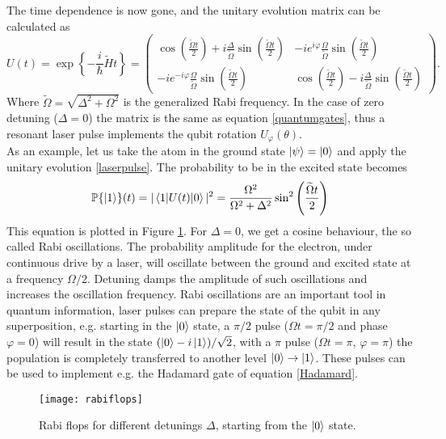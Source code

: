 The time dependence is now gone, and the unitary evolution matrix can be calculated as
\begin{equation}
\label{laserpulse}
U(t) = \exp\left\{-\frac{i}{\hbar} \widetilde{H} t \right\} =
 \begin{pmatrix}
  \cos\left(\frac{\widetilde{\Omega} t}{2}\right) + i \frac{\Delta}{\widetilde{\Omega}} \sin\left(\frac{\widetilde{\Omega} t}{2}\right) & -ie^{i\varphi}\frac{\Omega}{\widetilde{\Omega}}  \sin\left(\frac{\widetilde{\Omega} t}{2}\right) \\
  -ie^{-i\varphi}\frac{\Omega}{\widetilde{\Omega}}  \sin\left(\frac{\widetilde{\Omega} t}{2}\right)  & \cos\left(\frac{\widetilde{\Omega} t}{2}\right) - i \frac{\Delta}{\widetilde{\Omega}} \sin\left(\frac{\widetilde{\Omega} t}{2}\right)
\end{pmatrix}.
\end{equation}
Where $\widetilde{\Omega} = \sqrt{\Delta^2 + \Omega^2}$ is the generalized Rabi frequency. In the case of zero detuning ($\Delta = 0$) the matrix is the same as equation \eqref{quantumgates}, thus a resonant laser pulse implements the qubit rotation $U_{\varphi}(\theta)$.\\
As an example, let us take the atom in the ground state $\ket{\psi} = \ket{0}$ and apply the unitary evolution \eqref{laserpulse}. The probability to be in the excited state becomes
\begin{equation}
\mathbb{P}\{\ket{1}\}(t) = |\braket{1|U(t)|0}|^2 = \frac{\Omega^2}{\Omega^2+\Delta^2} \sin^2\left(\frac{\widetilde{\Omega}t}{2} \right)
\end{equation}
This equation is plotted in Figure \ref{rabiflops}. For $\Delta = 0$, we get a cosine behaviour, the so called Rabi oscillations. The probability amplitude for the electron, under continuous drive by a laser, will oscillate between the ground and excited state at a frequency $\Omega/2$. Detuning damps the amplitude of such oscillations and increases the oscillation frequency. Rabi oscillations are an important tool in quantum information, laser pulses can prepare the state of the qubit in any superposition, e.g. starting in the $\ket{0}$ state, a $\pi/2$ pulse ($\Omega t = \pi/2$ and phase $\varphi=0$) will result in the state $(\ket{0} - i\ket{1})/\sqrt{2}$, with a $\pi$ pulse ($\Omega t = \pi$, $\varphi=\pi$) the population is completely transferred to another level $\ket{0}\to \ket{1}$. These pulses can be used to implement e.g. the Hadamard gate of equation \eqref{Hadamard}.
\begin{figure}[H]
\centering
\texttt{[image: rabiflops]}
\caption{Rabi flops for different detunings $\Delta$, starting from the $\ket{0}$ state.}
\label{rabiflops}
\end{figure}
